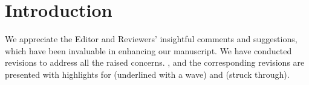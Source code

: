 \noindent\hrulefill
{}  

\section*{Introduction}
We appreciate the Editor and Reviewers' insightful comments and suggestions, which have been invaluable in enhancing our manuscript. We have conducted revisions to address all the raised concerns.  , and {\color{revision_color}the corresponding revisions are presented with highlights for  (underlined with a wave) and  (struck through).}\\
\indent